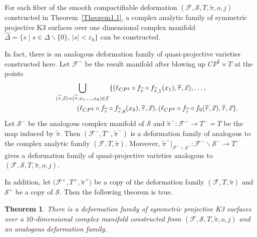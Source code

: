\documentclass[10pt,a4paper]{amsart}
\numberwithin{equation}{section}
\newtheorem{Theorem}{Theorem}[section]
\def\operatorname#1{#1}
\def\overline#1{#1}
\begin{document}
For each fiber of the smooth compactifiable deformation $(\mathcal{F},\mathcal{S},T,\widetilde{\pi},o,j)$ constructed in Theorem~\ref{Theorem1.1}, a complex analytic family of symmetric projective K3 surfaces over one dimensional complex manifold $\hat{\Delta}=\{ s\mid s \in \Delta \backslash \{ 0 \},\, |s|<\varepsilon_0 \}$ can be constructed.

In fact, there is an analogous deformation family of quasi-projective varieties constructed here. Let $\mathcal{F}^-$ be the result manifold after blowing up $\operatorname{CP}^2\times T$ at the points
\begin{gather*}
\bigcup_{(\widetilde{\tau},\vec{x})=(\widetilde{\tau},x_1,\dots ,x_8)\in T}\{(\ell_{CP^2}\circ f_{\widetilde{\tau}}\circ f_{\widetilde{\tau},1}(x_1),\widetilde{\tau},\vec{x}),\dots ,\\
\hphantom{\bigcup_{(\widetilde{\tau},\vec{x})=(\widetilde{\tau},x_1,\dots ,x_8)\in T}} (\ell_{CP^2}\circ f_{\widetilde{\tau}}\circ f_{\widetilde{\tau},8}(x_8),\widetilde{\tau},\vec{x}),(\ell_{CP^2}\circ f_{\widetilde{\tau}}\circ f_9(\widetilde{\tau},\vec{x}),\widetilde{\tau},\vec{x}\}.
\end{gather*}
Let $\mathcal{S}^-$ be the analogous complex manifold of $\mathcal{S}$ and $\widetilde{\pi}^-\colon\mathcal{F}^- \rightarrow T^-=T$ be the map induced by $\widetilde{\pi}$. Then $(\mathcal{F}^-, T^-, \widetilde{\pi}^-)$ is a deformation family of \smash{$\operatorname{CP}^2 \#9\overline{\operatorname{CP}}^2$} analogous to the complex analytic family $(\mathcal{F}, T, \widetilde{\pi})$. Moreover, $\widetilde{\pi}^-|_{\mathcal{F}^-\backslash \mathcal{S}^-}\colon{\mathcal{F}^-\backslash \mathcal{S}^-} \rightarrow T^-$ gives a deformation family of quasi-projective varieties analogous to $(\mathcal{F},\mathcal{S},T,\widetilde{\pi},o,j)$.

In addition, let $\bigl(\mathcal{F}^+, T^+, \widetilde{\pi}^+\bigr)$ be a copy of the deformation family $(\mathcal{F}, T, \widetilde{\pi})$ and $\mathcal{S}^+$ be a copy of $\mathcal{S}$. Then the following theorem is true.

\begin{Theorem} \label{Theorem4.3}
There is a deformation family of symmetric projective K3 surfaces over a $10$-dimensional complex manifold constructed from $(\mathcal{F},\mathcal{S},T,\widetilde{\pi},o,j)$ and an analogous deformation family.
\end{Theorem}
\end{document}
